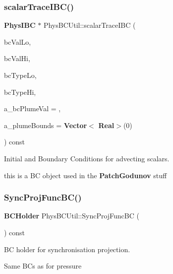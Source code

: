 \subsubsection{\texorpdfstring{scalar\+Trace\+I\+B\+C()}{scalarTraceIBC()}}
{\footnotesize\ttfamily \textbf{ Phys\+I\+BC} $\ast$ Phys\+B\+C\+Util\+::scalar\+Trace\+I\+BC (\begin{DoxyParamCaption}\item[{\textbf{ Real\+Vect}}]{bc\+Val\+Lo,  }\item[{\textbf{ Real\+Vect}}]{bc\+Val\+Hi,  }\item[{\textbf{ Int\+Vect}}]{bc\+Type\+Lo,  }\item[{\textbf{ Int\+Vect}}]{bc\+Type\+Hi,  }\item[{\textbf{ Real}}]{a\+\_\+bc\+Plume\+Val = {},  }\item[{\textbf{ Vector}$<$ \textbf{ Real} $>$}]{a\+\_\+plume\+Bounds = {\ttfamily \textbf{ Vector}$<$\textbf{ Real}$>$(0)} }\end{DoxyParamCaption}) const\hspace{0.3cm}{\ttfamily [virtual]}}



Initial and Boundary Conditions for advecting scalars. 

this is a BC object used in the \textbf{ Patch\+Godunov} stuff \mbox{\label{class_phys_b_c_util_af775d916ab409a2231492fbb1492a94b}} 
\subsubsection{\texorpdfstring{Sync\+Proj\+Func\+B\+C()}{SyncProjFuncBC()}}
{\footnotesize\ttfamily \textbf{ B\+C\+Holder} Phys\+B\+C\+Util\+::\+Sync\+Proj\+Func\+BC (\begin{DoxyParamCaption}{ }\end{DoxyParamCaption}) const\hspace{0.3cm}{\ttfamily [virtual]}}



BC holder for synchronisation projection. 

Same B\+Cs as for pressure \mbox{\label{class_phys_b_c_util_a68ef94f8d4002dabc19e7a24a671943e}} 
